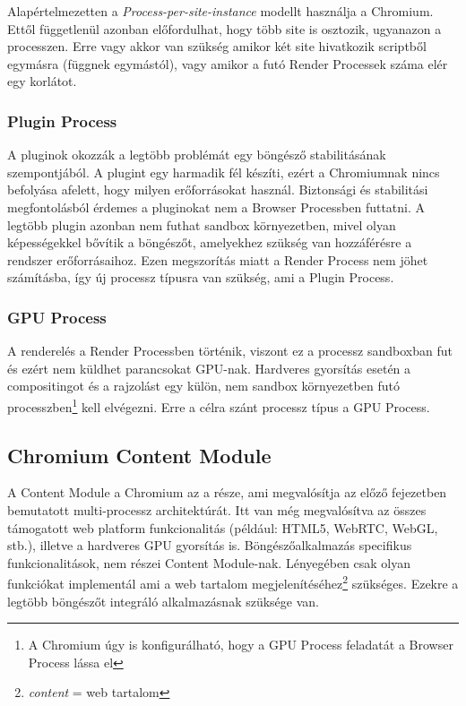 \documentclass[12pt]{report}
\begin{document}
\noindent
Alapértelmezetten a \textit{Process-per-site-instance} modellt használja a Chromium.
Ettől függetlenül azonban előfordulhat, hogy több site is osztozik, ugyanazon a processzen.
Erre vagy akkor van szükség amikor két site hivatkozik scriptből egymásra (függnek
egymástól), vagy amikor a futó Render Processek száma elér egy korlátot.
\cite{bib:chromium-process-models}

\subsubsection{Plugin Process}
A pluginok okozzák a legtöbb problémát egy böngésző stabilitásának szempontjából. A plugint
egy harmadik fél készíti, ezért a Chromiumnak nincs befolyása afelett, hogy milyen
erőforrásokat használ. Biztonsági és stabilitási megfontolásból érdemes a pluginokat nem
a Browser Processben futtatni. A legtöbb plugin azonban nem futhat sandbox környezetben,
mivel olyan képességekkel bővítik a böngészőt, amelyekhez szükség van hozzáférésre a rendszer
erőforrásaihoz. Ezen megszorítás miatt a Render Process nem jöhet számításba, így új
processz típusra van szükség, ami a Plugin Process.
\cite{bib:chromium-plugins}

\subsubsection{GPU Process}
A renderelés a Render Processben történik, viszont ez a processz sandboxban fut és ezért
nem küldhet parancsokat GPU-nak. Hardveres gyorsítás esetén a compositingot és a rajzolást
egy külön, nem sandbox környezetben futó processzben\footnote{A Chromium úgy is
konfigurálható, hogy a GPU Process feladatát a Browser Process lássa el} kell elvégezni.
Erre a célra szánt processz típus a GPU Process.
\cite{bib:chromium-gpu}

\subsection{Chromium Content Module}
A Content Module a Chromium az a része, ami megvalósítja az előző fejezetben bemutatott
multi-processz architektúrát. Itt van még megvalósítva az összes támogatott
web platform funkcionalitás (például: HTML5, WebRTC, WebGL, stb.), illetve
a hardveres GPU gyorsítás is. Böngészőalkalmazás specifikus funkcionalitások, nem részei
Content Module-nak. Lényegében csak olyan funkciókat implementál ami a web tartalom
megjelenítéséhez\footnote{\textit{content} = web tartalom} szükséges.
Ezekre a legtöbb böngészőt integráló alkalmazásnak szüksége van.
\cite{bib:chromium-content-module}
\end{document}
